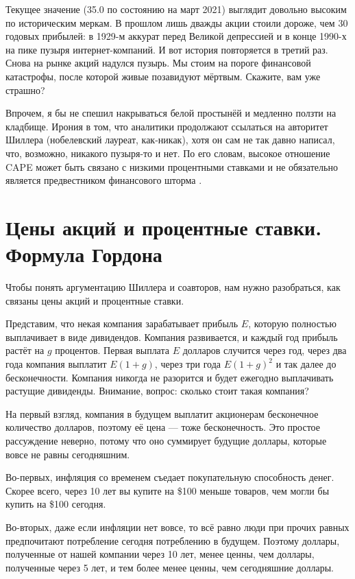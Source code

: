Текущее значение (35.0 по состоянию на март 2021) выглядит довольно высоким по историческим меркам. В прошлом лишь дважды акции стоили дороже, чем 30 годовых прибылей: в 1929-м аккурат перед Великой депрессией и в конце 1990-х на пике пузыря интернет-компаний. И вот история повторяется в третий раз. Снова на рынке акций надулся пузырь. Мы стоим на пороге финансовой катастрофы, после которой живые позавидуют мёртвым. Скажите, вам уже страшно?

Впрочем, я бы не спешил накрываться белой простынёй и медленно ползти на кладбище. Ирония в том, что аналитики продолжают ссылаться на авторитет Шиллера (нобелевский лауреат, как-никак), хотя он сам не так давно написал, что, возможно, никакого пузыря-то и нет. По его словам, высокое отношение CAPE может быть связано с низкими процентными ставками и не обязательно является предвестником финансового шторма \cite{shiller2020cape}.

\section*{Цены акций и процентные ставки. Формула Гордона}

Чтобы понять аргументацию Шиллера и соавторов, нам нужно разобраться, как связаны цены акций и процентные ставки.

Представим, что некая компания зарабатывает прибыль $E$, которую полностью выплачивает в виде дивидендов. Компания развивается, и каждый год прибыль растёт на $g$ процентов. Первая выплата $E$ долларов случится через год, через два года компания выплатит $E(1+g)$, через три года $E(1+g)^2$ и так далее до бесконечности. Компания никогда не разорится и будет ежегодно выплачивать  растущие дивиденды. Внимание, вопрос: сколько стоит такая компания?

На первый взгляд, компания в будущем выплатит акционерам бесконечное количество долларов, поэтому её цена --- тоже бесконечность. Это простое рассуждение неверно, потому что оно суммирует будущие доллары, которые вовсе не равны сегодняшним.

Во-первых, инфляция со временем съедает покупательную способность денег. Скорее всего, через 10 лет вы купите на \$100 меньше товаров, чем могли бы купить на \$100 сегодня.

Во-вторых, даже если инфляции нет вовсе, то всё равно люди при прочих равных предпочитают потребление сегодня потреблению в будущем. Поэтому доллары, полученные от нашей компании через 10 лет, менее ценны, чем доллары, полученные через 5 лет, и тем более менее ценны, чем сегодняшние доллары.

